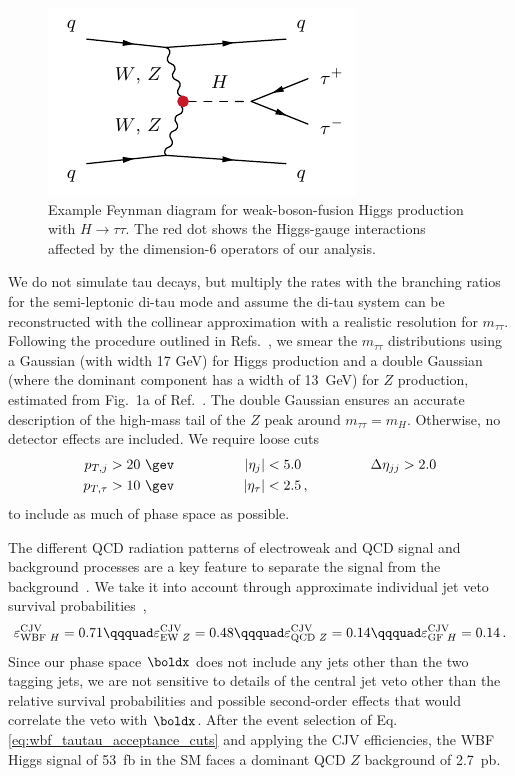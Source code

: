 \begin{figure}
  \includegraphics[width=0.36 \textwidth]{fig/information/wbf_tautau_diag.pdf}%
  \caption{Example Feynman diagram for weak-boson-fusion Higgs
    production with $H \to \tau \tau$. The red dot shows the
    Higgs-gauge interactions affected by the dimension-6 operators of
    our analysis.}
\label{fig:information_wbf_tautau_diag}
\end{figure}

We do not simulate tau decays, but multiply the rates with the
branching ratios for the semi-leptonic di-tau mode and assume the
di-tau system can be reconstructed with the collinear approximation
with a realistic resolution for $m_{\tau\tau}$. Following the
procedure outlined in Refs.~\cite{madmax1,madmax2}, we smear the
$m_{\tau \tau}$ distributions using a Gaussian (with width 17 GeV) for
Higgs production and a double Gaussian (where the dominant component
has a width of 13~GeV) for $Z$ production, estimated from Fig.~1a of
Ref.~\cite{Aad:2015vsa}. The double Gaussian ensures an accurate
description of the high-mass tail of the $Z$ peak around
$m_{\tau\tau} = m_H$.  Otherwise, no detector effects are included.
We require loose cuts
%
\begin{alignat}{3}
  p_{T,j} &> 20 \ \gev  \qquad & \qquad |\eta_{j}| &< 5.0  \qquad & \qquad 
  \Delta \eta_{jj} &> 2.0  \notag \\ 
  p_{T,\tau} &> 10 \ \gev  \qquad & \qquad |\eta_{\tau}| &< 2.5 \, ,
  \label{eq:wbf_tautau_acceptance_cuts}
\end{alignat}
%
to include as much of phase space as possible.

The different QCD
radiation patterns of electroweak and QCD signal and background
processes are a key feature to separate the signal from the
background~\cite{tagging}. We take it into account through approximate
individual jet veto survival probabilities~\cite{wbf_tau},
%
\begin{align}
  \varepsilon^\text{CJV}_{\text{WBF $H$}} = 0.71 \qqquad
  \varepsilon^\text{CJV}_{\text{EW $Z$}} = 0.48 \qqquad
  \varepsilon^\text{CJV}_{\text{QCD $Z$}} = 0.14 \qqquad
  \varepsilon^\text{CJV}_{\text{GF $H$}} = 0.14 \,.
\end{align}
%
Since our phase space $\boldx$ does not include any jets other than
the two tagging jets, we are not sensitive to details of the central
jet veto other than the relative survival probabilities and possible
second-order effects that would correlate the veto with
$\boldx$. After the event selection of
Eq.\;\eqref{eq:wbf_tautau_acceptance_cuts} and applying the CJV
efficiencies, the WBF Higgs signal of 53~fb in the SM faces a
dominant QCD $Z$ background of 2.7~pb.

